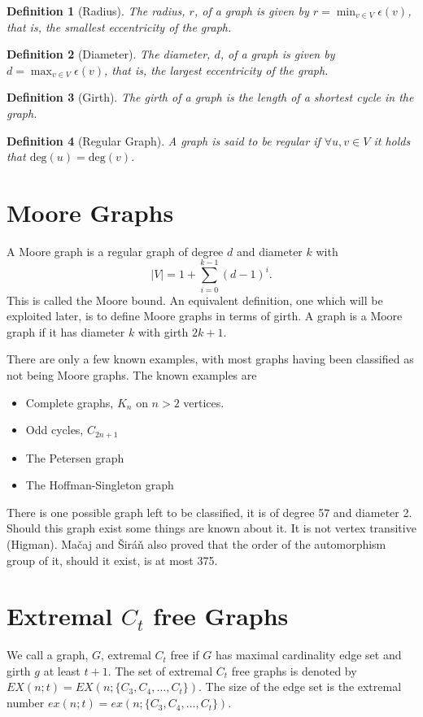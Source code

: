 \documentclass[a4paper]{article}
\newtheorem*{definition*}{Definition}
\renewcommand{\deg}[1]{\text{deg}#1}
\begin{document}
\begin{definition*}[Radius]
The radius, $r$, of a graph is given by $r=\min_{v\in V}\epsilon(v)$, that is, the smallest eccentricity of the graph.
\end{definition*}
\begin{definition*}[Diameter]
The diameter, $d$, of a graph is given by $d=\max_{v\in V}\epsilon(v)$, that is, the largest eccentricity of the graph.
\end{definition*}
\begin{definition*}[Girth]
The girth of a graph is the length of a shortest cycle in the graph.
\end{definition*}
\begin{definition*}[Regular Graph]
A graph is said to be regular if $\forall u,v\in V$ it holds that $\deg(u)=\deg(v)$.
\end{definition*}

\section{Moore Graphs}
A Moore graph is a regular graph of degree $d$ and diameter $k$ with $$|V|=1+\sum_{i=0}^{k-1}(d-1)^i.$$ This is called the Moore bound. An equivalent definition, one which will be exploited later, is to define Moore graphs in terms of girth. A graph is a Moore graph if it has diameter $k$ with girth $2k+1$.

There are only a few known examples, with most graphs having been classified as not being Moore graphs. The known examples are
\begin{itemize}
	\item Complete graphs, $K_n$ on $n>2$ vertices.
	\item Odd cycles, $C_{2n+1}$
	\item The Petersen graph
	\item The Hoffman-Singleton graph
\end{itemize}

There is one possible graph left to be classified, it is of degree 57 and diameter 2. Should this graph exist some things are known about it. It is not vertex transitive (Higman). Ma\v caj and \v Sir\'a\v n also proved that the order of the automorphism group of it, should it exist, is at most 375.

\section{Extremal $C_t$ free Graphs}
We call a graph, $G$, extremal $C_t$ free if $G$ has maximal cardinality edge set and girth $g$ at least $t+1$. The set of extremal $C_t$ free graphs is denoted by $EX(n; t)=EX(n;\{C_3, C_4,\ldots,C_t\})$. The size of the edge set is the extremal number $ex(n; t)=ex(n; \{C_3, C_4, \ldots, C_t\})$.
\end{document}
